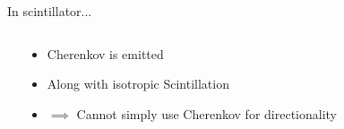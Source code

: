 \documentclass[14pt]{beamer}
\begin{document}
\begin{frame}{In scintillator...}
\begin{columns}[T]
\begin{block}{}
		\end{block}
		\begin{block}{}
			\begin{itemize}
				\item<3-> Cherenkov is emitted
				\item<4-> Along with isotropic Scintillation
				\item<5-> {\color{red}$\implies$ Cannot simply use Cherenkov
					for directionality}
			\end{itemize}
		\end{block}
	\end{columns}
\end{frame}
\end{document}
